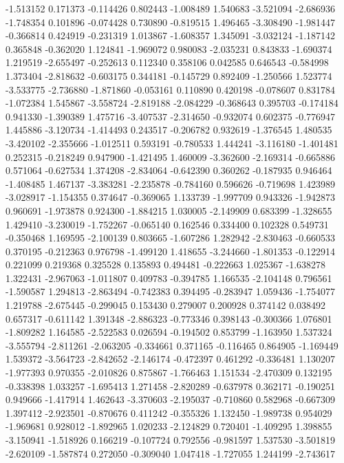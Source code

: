 -1.513152
0.171373
-0.114426
0.802443
-1.008489
1.540683
-3.521094
-2.686936
-1.748354
0.101896
-0.074428
0.730890
-0.819515
1.496465
-3.308490
-1.981447
-0.366814
0.424919
-0.231319
1.013867
-1.608357
1.345091
-3.032124
-1.187142
0.365848
-0.362020
1.124841
-1.969072
0.980083
-2.035231
0.843833
-1.690374
1.219519
-2.655497
-0.252613
0.112340
0.358106
0.042585
0.646543
-0.584998
1.373404
-2.818632
-0.603175
0.344181
-0.145729
0.892409
-1.250566
1.523774
-3.533775
-2.736880
-1.871860
-0.053161
0.110890
0.420198
-0.078607
0.831784
-1.072384
1.545867
-3.558724
-2.819188
-2.084229
-0.368643
0.395703
-0.174184
0.941330
-1.390389
1.475716
-3.407537
-2.314650
-0.932074
0.602375
-0.776947
1.445886
-3.120734
-1.414493
0.243517
-0.206782
0.932619
-1.376545
1.480535
-3.420102
-2.355666
-1.012511
0.593191
-0.780533
1.444241
-3.116180
-1.401481
0.252315
-0.218249
0.947900
-1.421495
1.460009
-3.362600
-2.169314
-0.665886
0.571064
-0.627534
1.374208
-2.834064
-0.642390
0.360262
-0.187935
0.946464
-1.408485
1.467137
-3.383281
-2.235878
-0.784160
0.596626
-0.719698
1.423989
-3.028917
-1.154355
0.374647
-0.369065
1.133739
-1.997709
0.943326
-1.942873
0.960691
-1.973878
0.924300
-1.884215
1.030005
-2.149909
0.683399
-1.328655
1.429410
-3.230019
-1.752267
-0.065140
0.162546
0.334400
0.102328
0.549731
-0.350468
1.169595
-2.100139
0.803665
-1.607286
1.282942
-2.830463
-0.660533
0.370195
-0.212363
0.976798
-1.499120
1.418655
-3.244660
-1.801353
-0.122914
0.221099
0.219368
0.325528
0.135893
0.494481
-0.222663
1.025367
-1.638278
1.322431
-2.967063
-1.011807
0.409783
-0.394785
1.166535
-2.104148
0.796561
-1.590587
1.294813
-2.863494
-0.742383
0.394495
-0.283947
1.059436
-1.754077
1.219788
-2.675445
-0.299045
0.153430
0.279007
0.200928
0.374142
0.038492
0.657317
-0.611142
1.391348
-2.886323
-0.773346
0.398143
-0.300366
1.076801
-1.809282
1.164585
-2.522583
0.026594
-0.194502
0.853799
-1.163950
1.537324
-3.555794
-2.811261
-2.063205
-0.334661
0.371165
-0.116465
0.864905
-1.169449
1.539372
-3.564723
-2.842652
-2.146174
-0.472397
0.461292
-0.336481
1.130207
-1.977393
0.970355
-2.010826
0.875867
-1.766463
1.151534
-2.470309
0.132195
-0.338398
1.033257
-1.695413
1.271458
-2.820289
-0.637978
0.362171
-0.190251
0.949666
-1.417914
1.462643
-3.370603
-2.195037
-0.710860
0.582968
-0.667309
1.397412
-2.923501
-0.870676
0.411242
-0.355326
1.132450
-1.989738
0.954029
-1.969681
0.928012
-1.892965
1.020233
-2.124829
0.720401
-1.409295
1.398855
-3.150941
-1.518926
0.166219
-0.107724
0.792556
-0.981597
1.537530
-3.501819
-2.620109
-1.587874
0.272050
-0.309040
1.047418
-1.727055
1.244199
-2.743617
